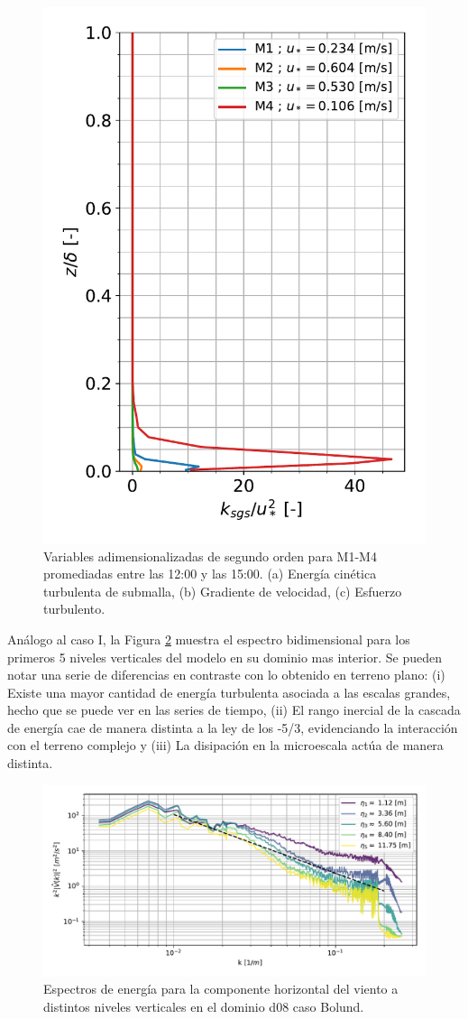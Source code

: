 \begin{figure}[H]
\begin{center}
		\includegraphics[height=0.5\linewidth,page=3,trim={12mm 5mm 3mm 0mm},clip]{Imagenes/06/bol/second_order_mean}%
	\end{center}
	\vspace{-5mm}
	\caption{Variables adimensionalizadas de segundo orden para M1-M4 promediadas entre las 12:00 y las 15:00. (a) Energía cinética turbulenta de submalla, (b) Gradiente de velocidad, (c) Esfuerzo turbulento. }
	\label{fig:06_bol_mean_secondorder}
\end{figure}
\newpage
Análogo al caso I, la Figura \ref{fig:06_bol_spectrum} muestra el espectro bidimensional para los primeros 5 niveles verticales del modelo en su dominio mas interior. Se pueden notar una serie de diferencias en contraste con lo obtenido en terreno plano: (i) Existe una mayor cantidad de energía turbulenta asociada a las escalas grandes, hecho que se puede ver en las series de tiempo, (ii) El rango inercial de la cascada de energía cae de manera distinta a la ley de los -5/3, evidenciando la interacción con el terreno complejo y (iii) La disipación en la microescala actúa de manera distinta.

\begin{figure}[H]
	\centering
	\includegraphics[width=1.0\linewidth,page=1,trim={3mm 5mm 3mm 3mm},clip]{Imagenes/06/bol/spectra}%
	\caption{Espectros de energía para la componente horizontal del viento a distintos niveles verticales en el dominio d08 caso Bolund.}
	\label{fig:06_bol_spectrum}
\end{figure}
